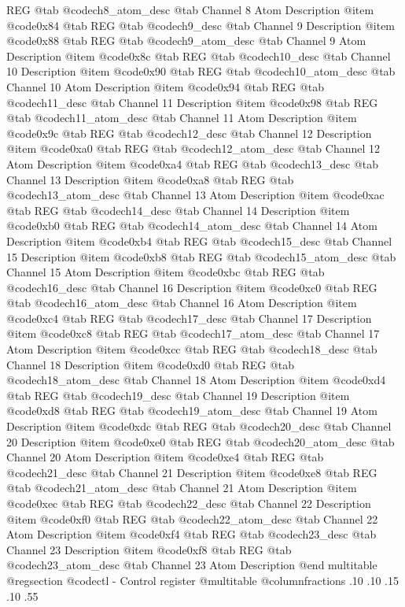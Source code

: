 REG @tab
@code{ch8_atom_desc} @tab
Channel 8 Atom Description
@item @code{0x84} @tab
REG @tab
@code{ch9_desc} @tab
Channel 9 Description
@item @code{0x88} @tab
REG @tab
@code{ch9_atom_desc} @tab
Channel 9 Atom Description
@item @code{0x8c} @tab
REG @tab
@code{ch10_desc} @tab
Channel 10 Description
@item @code{0x90} @tab
REG @tab
@code{ch10_atom_desc} @tab
Channel 10 Atom Description
@item @code{0x94} @tab
REG @tab
@code{ch11_desc} @tab
Channel 11 Description
@item @code{0x98} @tab
REG @tab
@code{ch11_atom_desc} @tab
Channel 11 Atom Description
@item @code{0x9c} @tab
REG @tab
@code{ch12_desc} @tab
Channel 12 Description
@item @code{0xa0} @tab
REG @tab
@code{ch12_atom_desc} @tab
Channel 12 Atom Description
@item @code{0xa4} @tab
REG @tab
@code{ch13_desc} @tab
Channel 13 Description
@item @code{0xa8} @tab
REG @tab
@code{ch13_atom_desc} @tab
Channel 13 Atom Description
@item @code{0xac} @tab
REG @tab
@code{ch14_desc} @tab
Channel 14 Description
@item @code{0xb0} @tab
REG @tab
@code{ch14_atom_desc} @tab
Channel 14 Atom Description
@item @code{0xb4} @tab
REG @tab
@code{ch15_desc} @tab
Channel 15 Description
@item @code{0xb8} @tab
REG @tab
@code{ch15_atom_desc} @tab
Channel 15 Atom Description
@item @code{0xbc} @tab
REG @tab
@code{ch16_desc} @tab
Channel 16 Description
@item @code{0xc0} @tab
REG @tab
@code{ch16_atom_desc} @tab
Channel 16 Atom Description
@item @code{0xc4} @tab
REG @tab
@code{ch17_desc} @tab
Channel 17 Description
@item @code{0xc8} @tab
REG @tab
@code{ch17_atom_desc} @tab
Channel 17 Atom Description
@item @code{0xcc} @tab
REG @tab
@code{ch18_desc} @tab
Channel 18 Description
@item @code{0xd0} @tab
REG @tab
@code{ch18_atom_desc} @tab
Channel 18 Atom Description
@item @code{0xd4} @tab
REG @tab
@code{ch19_desc} @tab
Channel 19 Description
@item @code{0xd8} @tab
REG @tab
@code{ch19_atom_desc} @tab
Channel 19 Atom Description
@item @code{0xdc} @tab
REG @tab
@code{ch20_desc} @tab
Channel 20 Description
@item @code{0xe0} @tab
REG @tab
@code{ch20_atom_desc} @tab
Channel 20 Atom Description
@item @code{0xe4} @tab
REG @tab
@code{ch21_desc} @tab
Channel 21 Description
@item @code{0xe8} @tab
REG @tab
@code{ch21_atom_desc} @tab
Channel 21 Atom Description
@item @code{0xec} @tab
REG @tab
@code{ch22_desc} @tab
Channel 22 Description
@item @code{0xf0} @tab
REG @tab
@code{ch22_atom_desc} @tab
Channel 22 Atom Description
@item @code{0xf4} @tab
REG @tab
@code{ch23_desc} @tab
Channel 23 Description
@item @code{0xf8} @tab
REG @tab
@code{ch23_atom_desc} @tab
Channel 23 Atom Description
@end multitable 
@regsection @code{ctl} - Control register
@multitable @columnfractions .10 .10 .15 .10 .55
